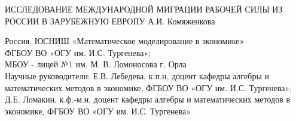 \documentclass{article}
\begin{document}
\begin{center} 
\large{ИССЛЕДОВАНИЕ МЕЖДУНАРОДНОЙ МИГРАЦИИ РАБОЧЕЙ СИЛЫ ИЗ РОССИИ В ЗАРУБЕЖНУЮ ЕВРОПУ}
\large{А.И. Комяженкова}

Россия, ЮСНИШ «Математическое моделирование в экономике» \\ ФГБОУ ВО «ОГУ им. И.С. Тургенева»;\\МБОУ - лицей №1 им. М. В. Ломоносова г. Орла\\
Научные руководители: Е.В. Лебедева, к.п.н, доцент кафедры алгебры и\\  математических методов в экономике, ФГБОУ ВО «ОГУ им. И.С. Тургенева»;\\  Д.Е. Ломакин, к.ф.-м.н, доцент кафедры алгебры и математических методов в  экономике, ФГБОУ ВО «ОГУ им. И.С. Тургенева»
\end{center}
\end{document}
